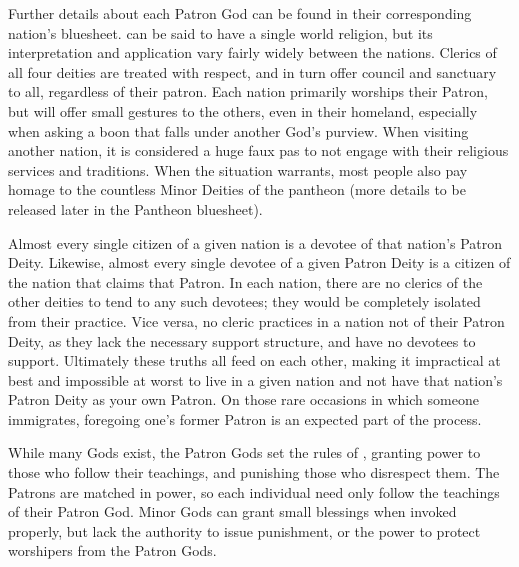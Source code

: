\documentclass[blue]{GL2020}
\begin{document}
Further details about each Patron God can be found in their corresponding nation's bluesheet. \pEarth{} can be said to have a single world religion, but its interpretation and application vary fairly widely between the nations. Clerics of all four deities are treated with respect, and in turn offer council and sanctuary to all, regardless of their patron. Each nation primarily worships their Patron, but will offer small gestures to the others, even in their homeland, especially when asking a boon that falls under another God's purview. When visiting another nation, it is considered a huge faux pas to not engage with their religious services and traditions. When the situation warrants, most people also pay homage to the countless Minor Deities of the pantheon (more details to be released later in the Pantheon bluesheet).

Almost every single citizen of a given nation is a devotee of that nation’s Patron Deity. Likewise, almost every single devotee of a given Patron Deity is a citizen of the nation that claims that Patron. In each nation, there are no clerics of the other deities to tend to any such devotees; they would be completely isolated from their practice. Vice versa, no cleric practices in a nation not of their Patron Deity, as they lack the necessary support structure, and have no devotees to support. Ultimately these truths all feed on each other, making it impractical at best and impossible at worst to live in a given nation and not have that nation’s Patron Deity as your own Patron. On those rare occasions in which someone immigrates, foregoing one’s former Patron is an expected part of the process.

While many Gods exist, the Patron Gods set the rules of \pEarth{}, granting power to those who follow their teachings, and punishing those who disrespect them. The Patrons are matched in power, so each individual need only follow the teachings of their Patron God. Minor Gods can grant small blessings when invoked properly, but lack the authority to issue punishment, or the power to protect worshipers from the Patron Gods.
\end{document}
